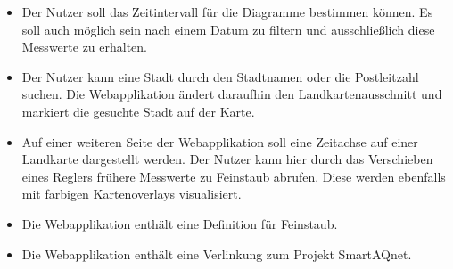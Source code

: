\begin{itemize}
	\item Der Nutzer soll das Zeitintervall für die Diagramme bestimmen können. Es soll auch möglich sein nach einem Datum zu filtern und ausschließlich diese Messwerte zu erhalten.
	\item Der Nutzer kann eine Stadt durch den Stadtnamen oder die Postleitzahl suchen. Die Webapplikation ändert daraufhin den Landkartenausschnitt und markiert die gesuchte Stadt auf der Karte.
	\item Auf einer weiteren Seite der Webapplikation soll eine Zeitachse auf einer Landkarte dargestellt werden. Der Nutzer kann hier durch das Verschieben eines Reglers frühere Messwerte zu \gls{Feinstaub} abrufen. Diese werden ebenfalls mit farbigen \glspl{Kartenoverlay} visualisiert.
	\item Die Webapplikation enthält eine Definition für \gls{Feinstaub}.
	\item Die Webapplikation enthält eine Verlinkung zum Projekt \gls{SmartAQnet}. 
\end{itemize}
